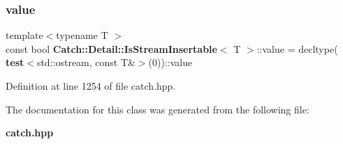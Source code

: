 \subsubsection{value}
{\footnotesize\ttfamily template$<$typename T $>$ \\
const bool \textbf{ Catch\+::\+Detail\+::\+Is\+Stream\+Insertable}$<$ T $>$\+::value = decltype(\textbf{ test}$<$std\+::ostream, const T\&$>$(0))\+::value\hspace{0.3cm}{\ttfamily [static]}}



Definition at line 1254 of file catch.\+hpp.



The documentation for this class was generated from the following file\+:\begin{DoxyCompactItemize}
\item 
\textbf{ catch.\+hpp}\end{DoxyCompactItemize}
